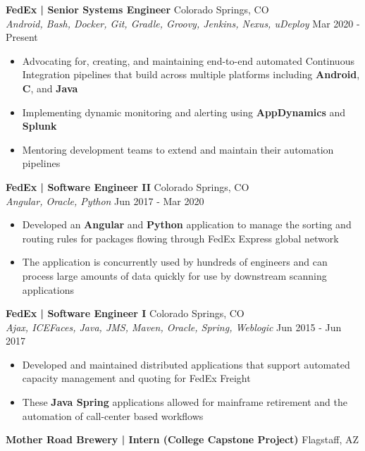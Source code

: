 \documentclass[a4paper]{article}
\begin{document}
\textbf{FedEx | Senior Systems Engineer} \hfill Colorado Springs, CO\\
\textsl{Android, Bash, Docker, Git, Gradle, Groovy, Jenkins, Nexus, uDeploy} \hfill Mar 2020 - Present\\
\vspace{-1mm}
\begin{itemize} \itemsep 1pt
	\item 	Advocating for, creating, and maintaining end-to-end automated Continuous Integration pipelines that build across multiple platforms including \textbf{Android}, \textbf{C}, and \textbf{Java}
	\item  Implementing dynamic monitoring and alerting using \textbf{AppDynamics} and \textbf{Splunk} 
	\item  Mentoring development teams to extend and maintain their automation pipelines
\end{itemize}
\textbf{FedEx | Software Engineer II} \hfill Colorado Springs, CO\\
\textsl{Angular, Oracle, Python} \hfill Jun 2017 - Mar 2020\\
\vspace{-1mm}
\begin{itemize} \itemsep 1pt
	\item  Developed an \textbf{Angular} and \textbf{Python} application to manage the sorting and routing rules for packages flowing through FedEx Express global network 
	\item  The application is concurrently used by hundreds of engineers and can process large amounts of data quickly for use by downstream scanning applications
\end{itemize}
\textbf{FedEx | Software Engineer I} \hfill Colorado Springs, CO\\
\textsl{Ajax, ICEFaces, Java, JMS, Maven, Oracle, Spring, Weblogic} \hfill Jun 2015 - Jun 2017\\
\vspace{-1mm}
\begin{itemize} \itemsep 1pt
	\item  Developed and maintained distributed applications that support automated capacity management and quoting for FedEx Freight 
	\item These \textbf{Java Spring} applications allowed for mainframe retirement and the automation of call-center based workflows
\end{itemize}
\textbf{Mother Road Brewery | Intern (College Capstone Project)} \hfill Flagstaff, AZ\\
\end{document}
